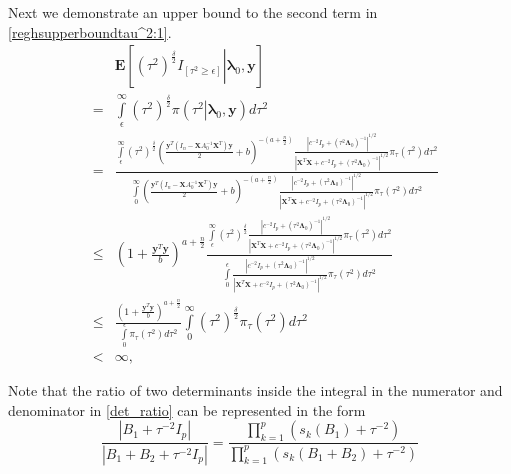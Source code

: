 \documentclass[noinfoline,11pt]{imsart}
\numberwithin{equation}{section}
\theoremstyle{plain}
\newcommand{\y}{\mathbf{y}}
\newcommand{\X}{\mathbf{X}}
\newcommand{\bl}{\boldsymbol{\lambda}}
\newcommand{\Bl}{\boldsymbol{\Lambda}}
\newcommand{\E}{\boldsymbol{E}}
\begin{document}
\noindent
Next we demonstrate an upper bound to the second term in \eqref{reghsupperboundtau^2:1}.
\begin{eqnarray}
 & & \E\left[\left.\left(\tau^2\right)^{\frac{\delta}{2}}I_{\left[\tau^2\geq\epsilon\right]}\right| \bl_0,\y\right] \nonumber\\
 &=&\int\limits_{\epsilon}^\infty\left(\tau^2\right)^{\frac{\delta}{2}}\pi\left(\left.\tau^2\right|\bl_0,\y\right)d\tau^2\nonumber \\
 &=& \frac{\int\limits_{\epsilon}^\infty\left(\tau^2\right)^{\frac{\delta}{2}}\left(\frac{\y^T\left(I_n-\X A_0^{-1}\X^T\right)\y}{2}+b\right)^{-\left(a+\frac{n}{2}\right)}\frac{\left|c^{-2}I_p+\left(\tau^2\Bl_0\right)^{-1}\right|^{1/2}}{\left|\X^T\X+c^{-2}I_p+\left(\tau^2\Bl_0\right)^{-1}\right|^{1/2}}\pi_\tau\left(\tau^2\right)d\tau^2}{\int\limits_{0}^\infty\left(\frac{\y^T\left(I_n-\X A_0^{-1}\X^T\right)\y}{2}+b\right)^{-\left(a+\frac{n}{2}\right)}\frac{\left|c^{-2}I_p+\left(\tau^2\Bl_0\right)^{-1}\right|^{1/2}}{\left|\X^T\X+c^{-2}I_p+\left(\tau^2\Bl_0\right)^{-1}\right|^{1/2}}\pi_\tau\left(\tau^2\right)d\tau^2}\nonumber \\
 &\leq& \left(1+\frac{\y^T\y}{b}\right)^{a+\frac{n}{2}}\frac{\int\limits_{\epsilon}^\infty\left(\tau^2\right)^{\frac{\delta}{2}}\frac{\left|c^{-2}I_p+\left(\tau^2\Bl_0\right)^{-1}\right|^{1/2}}{\left|\X^T\X+c^{-2}I_p+\left(\tau^2\Bl_0\right)^{-1}\right|^{1/2}}\pi_\tau\left(\tau^2\right)d\tau^2}{\int\limits_0^\epsilon\frac{\left|c^{-2}I_p+\left(\tau^2\Bl_0\right)^{-1}\right|^{1/2}}{\left|\X^T\X+c^{-2}I_p+\left(\tau^2\Bl_0\right)^{-1}\right|^{1/2}}\pi_\tau\left(\tau^2\right)d\tau^2} \label{det_ratio}\\
 &\leq&\frac{\left(1+\frac{\y^T\y}{b}\right)^{a+\frac{n}{2}}}{\int\limits_{0}^\epsilon\pi_\tau\left(\tau^2\right)d\tau^2}\int\limits_{0}^\infty\left(\tau^2\right)^{\frac{\delta}{2}}\pi_\tau\left(\tau^2\right)d\tau^2\nonumber \\
 &<& \infty \nonumber,
\end{eqnarray}

\noindent
Note that the ratio of two determinants inside the integral in the numerator and denominator in \eqref{det_ratio} can be represented in the form 
$$
\frac{|B_1 + \tau^{-2} I_p|}{|B_1 + B_2 + \tau^{-2} I_p|} = \frac{\prod_{k=1}^p 
(s_k (B_1) + \tau^{-2})}{\prod_{k=1}^p (s_k (B_1 + B_2) + \tau^{-2})} 
$$
\end{document}
